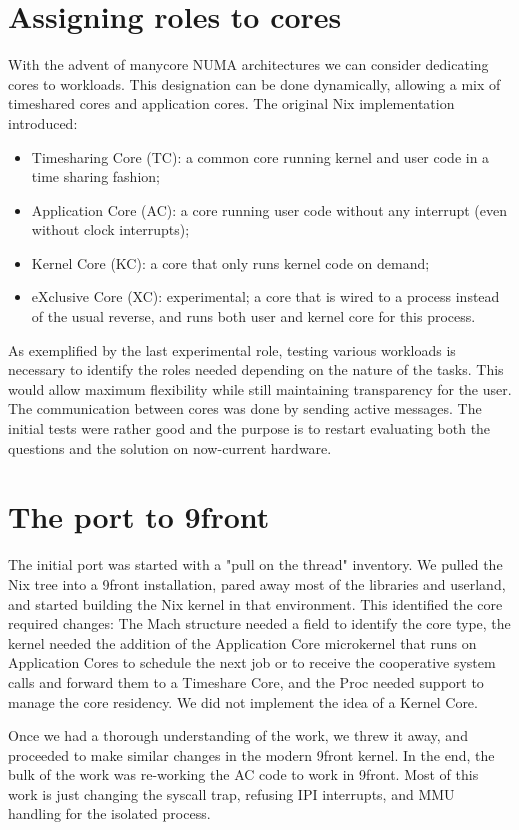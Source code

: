 \documentclass{article}
\begin{document}
\section{Assigning roles to cores}
With the advent of manycore NUMA architectures we can consider dedicating cores to workloads.
This designation can be done dynamically, allowing a mix of timeshared cores and application cores.
The original Nix implementation introduced:
\begin{itemize}
\item Timesharing Core (TC): a common core running kernel and user code in a time sharing fashion;
\item Application Core (AC): a core running user code without any interrupt (even without clock interrupts);
\item Kernel Core (KC): a core that only runs kernel code on demand;
\item eXclusive Core (XC): experimental; a core that is wired to a process instead of the usual reverse, and runs both user and kernel core for this process.
\end{itemize}

As exemplified by the last experimental role, testing various workloads is necessary to identify the roles needed depending on the nature of the tasks.  This would allow maximum flexibility while still maintaining transparency for the user.
The communication between cores was done by sending active messages.
The initial tests were rather good and the purpose is to restart evaluating both the questions and the solution on now-current hardware.

\section{The port to 9front}
The initial port was started with a "pull on the thread" inventory.
We pulled the Nix tree into a 9front installation, pared away most of the libraries and userland, and started building the Nix kernel in that environment.
This identified the core required changes: The Mach structure needed a field to identify the core type, the kernel needed the addition of the Application Core microkernel that runs on Application Cores to schedule the next job or to receive the cooperative system calls and forward them to a Timeshare Core, and the Proc needed support to manage the core residency.
We did not implement the idea of a Kernel Core.

Once we had a thorough understanding of the work, we threw it away, and proceeded to make similar changes in the modern 9front kernel.
In the end, the bulk of the work was re-working the AC code to work in 9front.
Most of this work is just changing the syscall trap, refusing IPI interrupts, and MMU handling for the isolated process.
\end{document}
